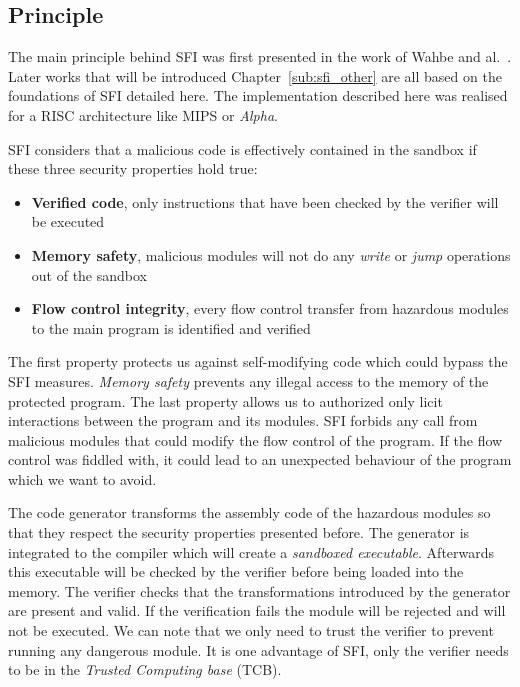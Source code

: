 \documentclass[11pt]{sdm}
\begin{document}
\subsection{Principle}

The main principle behind SFI was first presented in the work of Wahbe and al.~\cite{Wahbe:1993:ESF:173668.168635}.
Later works that will be introduced Chapter~\ref{sub:sfi_other} are all based on the foundations of SFI detailed here.
The implementation described here was realised for a RISC architecture like MIPS or \textit{Alpha}.

SFI considers that a malicious code is effectively contained in the sandbox if these three security properties hold true:
\begin{itemize}
	\item \textbf{Verified code}, only instructions that have been checked by the verifier will be executed 
	\item \textbf{Memory safety}, malicious modules will not do any \textit{write} or \textit{jump} operations out of the sandbox
	\item \textbf{Flow control integrity}, every flow control transfer from hazardous modules to the main program is identified and verified
\end{itemize}
The first property protects us against self-modifying code which could bypass the SFI measures. \textit{Memory safety} prevents any illegal access to the memory of the protected program. The last property allows us to authorized only licit interactions between the program and its modules. SFI forbids any call from malicious modules that could modify the flow control of the program. If the flow control was fiddled with, it could lead to an unexpected behaviour of the program which we want to avoid.

The code generator transforms the assembly code of the hazardous modules so that they respect the security properties presented before. The generator is integrated to the compiler which will create a \textit{sandboxed executable}. Afterwards this executable will be checked by the verifier before being loaded into the memory. 
The verifier checks that the transformations introduced by the generator are present and valid. 
If the verification fails the module will be rejected and will not be executed. We can note that we only need to trust the verifier to prevent running any dangerous module. 
It is one advantage of SFI, only the verifier needs to be in the \textit{Trusted Computing base} (TCB).
\end{document}
